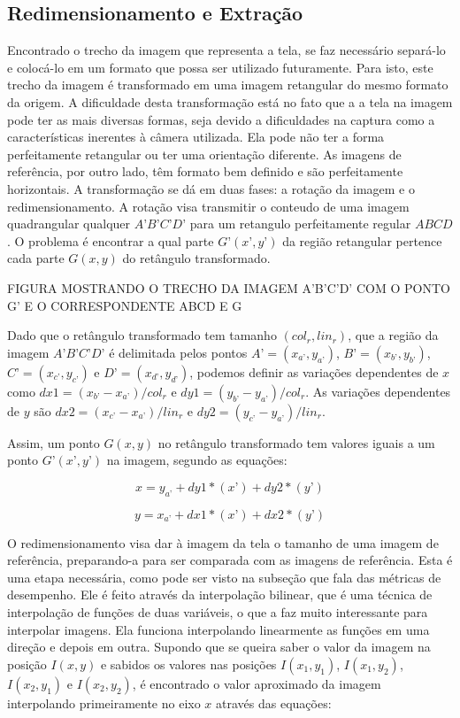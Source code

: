 \subsection{Redimensionamento e Extração}

Encontrado o trecho da imagem que representa a tela, se faz necessário separá-lo e colocá-lo em um formato que possa ser utilizado futuramente. Para isto, este trecho da imagem é transformado em uma imagem retangular do mesmo formato da origem. A dificuldade desta transformação está no fato que a a tela na imagem pode ter as mais diversas formas, seja devido a dificuldades na captura como a características inerentes à câmera utilizada. Ela pode não ter a forma perfeitamente retangular ou ter uma orientação diferente. As imagens de referência, por outro lado, têm formato bem definido e são perfeitamente horizontais.
A transformação se dá em duas fases: a rotação da imagem e o redimensionamento. A rotação visa transmitir o conteudo de uma imagem quadrangular qualquer $A’B’C’D’$ para um retangulo perfeitamente regular $ABCD$. O problema é encontrar a qual parte $G’(x’,y’)$ da região retangular pertence cada parte $G(x,y)$ do retângulo transformado.

FIGURA MOSTRANDO O TRECHO DA IMAGEM A’B’C’D’ COM O PONTO G’ E O CORRESPONDENTE ABCD E G

Dado que o retângulo transformado tem tamanho $(col_r,lin_r)$, que a região da imagem $A’B’C’D’$ é delimitada pelos pontos $A’ = (x_{a’},y_{a’})$, $B’ = (x_{b’},y_{b’})$, $C’ = (x_{c’},y_{c’})$ e $D’ = (x_{d’},y_{d’})$, podemos definir as variações dependentes de $x$ como $dx1 = (x_{b’}-x_{a’})/{col_r}$ e $dy1 = (y_{b’}-y_{a’})/{col_r}$. As variações dependentes de $y$ são $dx2 = (x_{c’}-x_{a’})/{lin_r}$ e $dy2 = (y_{c’}-y_{a’})/{lin_r}$.


Assim, um ponto $G(x,y)$ no retângulo transformado tem valores iguais a um ponto $G’(x’,y’)$ na imagem, segundo as equações:

$$ x = y_{a’} + dy1*(x’) + dy2*(y’) $$

$$ y = x_{a’} + dx1*(x’) + dx2*(y’) $$

O redimensionamento visa dar à imagem da tela o tamanho de uma imagem de referência, preparando-a para ser comparada com as imagens de referência. Esta é uma etapa necessária, como pode ser visto na subseção que fala das métricas de desempenho. Ele é feito através da interpolação bilinear, que é uma técnica de interpolação de funções de duas variáveis, o que a faz muito interessante para interpolar imagens.
Ela funciona interpolando linearmente as funções em uma direção e depois em outra. Supondo que se queira saber o valor da imagem na posição $I(x,y)$ e sabidos os valores nas posições $I(x_1,y_1)$, $I(x_1,y_2)$, $I(x_2,y_1)$ e $I(x_2,y_2)$, é encontrado o valor aproximado da imagem interpolando primeiramente no eixo $x$ através das equações:

